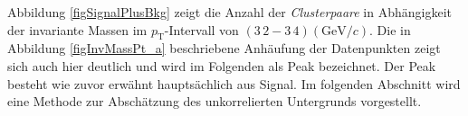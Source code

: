 \newline
Abbildung \ref{figSignalPlusBkg} zeigt die Anzahl der \textit{Clusterpaare} in Abhängigkeit der invariante Massen im $p_{\text{T}}$-Intervall von $(3\,2 - 3\,4)(\text{GeV}/c)$.
Die in Abbildung \ref{figInvMassPt_a} beschriebene Anhäufung der Datenpunkten zeigt sich auch hier deutlich und wird im Folgenden als Peak bezeichnet.
Der Peak besteht wie zuvor erwähnt hauptsächlich aus Signal.
\newline
Im folgenden Abschnitt wird eine Methode zur Abschätzung des unkorrelierten Untergrunds vorgestellt. 